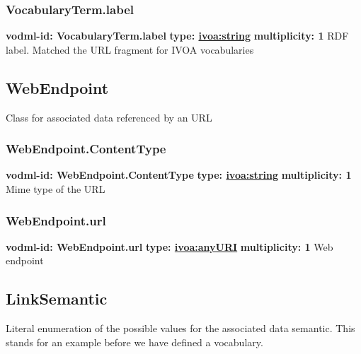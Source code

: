     \subsubsection{VocabularyTerm.label}
      \textbf{vodml-id: VocabularyTerm.label} \newline
      \textbf{type: \hyperref[sect:ivoa]{ivoa:string}} \newline
      \textbf{multiplicity: 1} \newline 
      RDF label. Matched the URL fragment for IVOA vocabularies

  \subsection{WebEndpoint}
  \label{sect:WebEndpoint}
    Class for associated data referenced by an URL

    \subsubsection{WebEndpoint.ContentType}
      \textbf{vodml-id: WebEndpoint.ContentType} \newline
      \textbf{type: \hyperref[sect:ivoa]{ivoa:string}} \newline
      \textbf{multiplicity: 1} \newline 
      Mime type of the URL

    \subsubsection{WebEndpoint.url}
      \textbf{vodml-id: WebEndpoint.url} \newline
      \textbf{type: \hyperref[sect:ivoa]{ivoa:anyURI}} \newline
      \textbf{multiplicity: 1} \newline 
      Web endpoint

  \subsection{LinkSemantic}
  \label{sect:LinkSemantic}

  Literal enumeration of the possible values for the associated data semantic. This stands for an example before we have defined a vocabulary.

